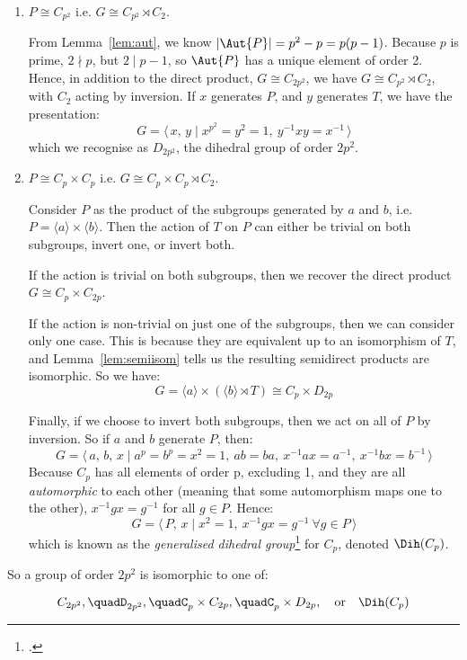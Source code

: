 \begin{enumerate}
    \item \(P \cong C_{p^2}\) i.e. \(G \cong C_{p^2} \rtimes C_2\).

        From Lemma~\ref{lem:aut}, we know \(|\Aut{P}| = p^2 - p = p(p-1)\).
        Because \(p\) is prime, \(2 \nmid p\), but \( 2 \mid p - 1\), so \(\Aut{P}\) has a unique element of order 2.
        Hence, in addition to the direct product, \(G \cong C_{2p^2}\), we have \(G \cong C_{p^2} \rtimes C_2\),
        with \(C_2\) acting by inversion.
        If \(x\) generates \(P\), and \(y\) generates \(T\), we have the presentation:
        \[G = \langle\, x,\,y \mid x^{p^2} = y^2 = 1,\ y^{-1}xy = x^{-1}\,\rangle\]
        which we recognise as \(D_{2p^2}\), the dihedral group of order \(2p^2\).

    \item \(P \cong C_p \times C_p\) i.e. \(G \cong C_p \times C_p \rtimes C_2\).

        Consider \(P\) as the product of the subgroups generated by \(a\) and \(b\), i.e. \(P = \langle a \rangle \times
        \langle b \rangle\).
        Then the action of \(T\) on \(P\) can either be trivial on both subgroups, invert one, or invert both.

        If the action is trivial on both subgroups, then we recover the direct product \(G \cong C_p \times C_{2p}\).

        If the action is non-trivial on just one of the subgroups, then we can consider only one case.
        This is because they are equivalent up to an isomorphism of \(T\), and Lemma~\ref{lem:semiisom} tells us the
        resulting semidirect products are isomorphic.
        So we have:
        \[G = \langle a \rangle \times (\langle b \rangle \rtimes T) \cong C_p \times D_{2p}\]

        Finally, if we choose to invert both subgroups, then we act on all of \(P\) by inversion.
        So if \(a\) and \(b\) generate \(P\), then:
        \[G = \langle\, a,\,b,\,x \mid a^p = b^p = x^2 = 1,\ ab = ba,\ x^{-1}ax = a^{-1},\ x^{-1}bx = b^{-1}\,\rangle\]
        Because \(C_p\) has all elements of order p, excluding 1, and they are all \emph{automorphic} to each other (meaning
        that some automorphism maps one to the other), \(x^{-1}gx = g^{-1}\) for all \(g \in P\).
        Hence:
        \[G = \langle\, P,\,x \mid x^2 = 1,\ x^{-1}gx = g^{-1}\ \forall g \in P \,\rangle\]
        which is known as the \emph{generalised dihedral group}\footcite{gendihedral} for \(C_p\), denoted \(\Dih(C_p)\).
\end{enumerate}

So a group of order \(2p^2\) is isomorphic to one of:

\[%
    C_{2p^2}, \quad%
    D_{2p^2}, \quad%
    C_p \times C_{2p}, \quad%
    C_p \times D_{2p}, \quad \text{or} \quad%
    \Dih(C_p)
\]

